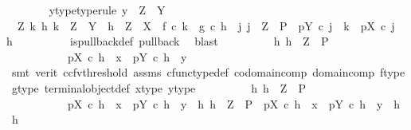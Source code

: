 \begin{isabellebody}
\ \ \ \ \ \ \isamarkupfalse%
\ y{\isacharunderscore}{\kern0pt}type{\isacharbrackleft}{\kern0pt}type{\isacharunderscore}{\kern0pt}rule{\isacharbrackright}{\kern0pt}{\isacharcolon}{\kern0pt}\ {\isachardoublequoteopen}y\ {\isacharcolon}{\kern0pt}\ Z\ {\isasymrightarrow}\ Y{\isachardoublequoteclose}\isanewline
\ \ \ \ \ \ \isamarkupfalse%
\ \ {\isachardoublequoteopen}{\isasymAnd}Z\ k\ h{\isachardot}{\kern0pt}\ k\ {\isacharcolon}{\kern0pt}\ Z\ {\isasymrightarrow}\ Y\ {\isasymLongrightarrow}\ h\ {\isacharcolon}{\kern0pt}\ Z\ {\isasymrightarrow}\ X\ {\isasymLongrightarrow}\ f\ {\isasymcirc}\isactrlsub c\ k\ {\isacharequal}{\kern0pt}\ g\ {\isasymcirc}\isactrlsub c\ h\ {\isasymLongrightarrow}\ {\isasymexists}j{\isachardot}{\kern0pt}\ j\ {\isacharcolon}{\kern0pt}\ Z\ {\isasymrightarrow}\ P\ {\isasymand}\ pY\ {\isasymcirc}\isactrlsub c\ j\ {\isacharequal}{\kern0pt}\ k\ {\isasymand}\ pX\ {\isasymcirc}\isactrlsub c\ j\ {\isacharequal}{\kern0pt}\ h{\isachardoublequoteclose}\isanewline
\ \ \ \ \ \ \ \ \isamarkupfalse%
\ is{\isacharunderscore}{\kern0pt}pullback{\isacharunderscore}{\kern0pt}def\ pullback\ \isamarkupfalse%
\ blast\isanewline
\ \ \ \ \ \ \isamarkupfalse%
\ \isamarkupfalse%
\ {\isachardoublequoteopen}{\isasymexists}h{\isachardot}{\kern0pt}\ h\ {\isacharcolon}{\kern0pt}\ Z\ {\isasymrightarrow}\ P\ {\isasymand}\isanewline
\ \ \ \ \ \ \ \ \ \ \ pX\ {\isasymcirc}\isactrlsub c\ h\ {\isacharequal}{\kern0pt}\ x\ {\isasymand}\ pY\ {\isasymcirc}\isactrlsub c\ h\ {\isacharequal}{\kern0pt}\ y{\isachardoublequoteclose}\isanewline
\ \ \ \ \ \ \ \ \isamarkupfalse%
\ {\isacharparenleft}{\kern0pt}smt\ {\isacharparenleft}{\kern0pt}verit{\isacharcomma}{\kern0pt}\ ccfv{\isacharunderscore}{\kern0pt}threshold{\isacharparenright}{\kern0pt}\ assms\ cfunc{\isacharunderscore}{\kern0pt}type{\isacharunderscore}{\kern0pt}def\ codomain{\isacharunderscore}{\kern0pt}comp\ domain{\isacharunderscore}{\kern0pt}comp\ f{\isacharunderscore}{\kern0pt}type\ g{\isacharunderscore}{\kern0pt}type\ terminal{\isacharunderscore}{\kern0pt}object{\isacharunderscore}{\kern0pt}def\ x{\isacharunderscore}{\kern0pt}type\ y{\isacharunderscore}{\kern0pt}type{\isacharparenright}{\kern0pt}\isanewline
\ \ \ \ \ \ \isamarkupfalse%
\ \isamarkupfalse%
\ {\isachardoublequoteopen}{\isasymexists}h{\isachardot}{\kern0pt}\ h\ {\isacharcolon}{\kern0pt}\ Z\ {\isasymrightarrow}\ P\ {\isasymand}\isanewline
\ \ \ \ \ \ \ \ \ \ \ pX\ {\isasymcirc}\isactrlsub c\ h\ {\isacharequal}{\kern0pt}\ x\ {\isasymand}\ pY\ {\isasymcirc}\isactrlsub c\ h\ {\isacharequal}{\kern0pt}\ y\ {\isasymand}\ {\isacharparenleft}{\kern0pt}{\isasymforall}h{}{\isachardot}{\kern0pt}\ h{}\ {\isacharcolon}{\kern0pt}\ Z\ {\isasymrightarrow}\ P\ {\isasymand}\ pX\ {\isasymcirc}\isactrlsub c\ h{}\ {\isacharequal}{\kern0pt}\ x\ {\isasymand}\ pY\ {\isasymcirc}\isactrlsub c\ h{}\ {\isacharequal}{\kern0pt}\ y\ {\isasymlongrightarrow}\ h{}\ {\isacharequal}{\kern0pt}\ h{\isacharparenright}{\kern0pt}{\isachardoublequoteclose}\isanewline

\end{isabellebody}

